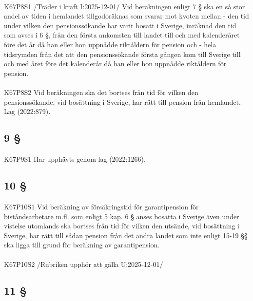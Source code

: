 \documentclass[a4paper,notitlepage,openany,10pt]{book}
\begin{document}
\paragraph*{}
{\tiny K67P8S1}
/Träder i kraft I:2025-12-01/
Vid beräkningen enligt 7 § ska en så stor andel av tiden i hemlandet tillgodoräknas som svarar mot kvoten mellan
\newline - den tid under vilken den pensionssökande har varit bosatt i Sverige, inräknad den tid som avses i 6 §, från den första ankomsten till landet till och med kalenderåret före det år då han eller hon uppnådde riktåldern för pension och
\newline - hela tidsrymden från det att den pensionssökande första gången kom till Sverige till och med året före det kalenderår då han eller hon uppnådde riktåldern för pension.
\paragraph*{}
{\tiny K67P8S2}
Vid beräkningen ska det bortses från tid för vilken den pensionssökande, vid bosättning i Sverige, har rätt till pension från hemlandet.
Lag (2022:879).
\subsection*{9 §}
\paragraph*{}
{\tiny K67P9S1}
Har upphävts genom
lag (2022:1266).
\subsection*{10 §}
\paragraph*{}
{\tiny K67P10S1}
Vid beräkning av försäkringstid för garantipension för biståndsarbetare m.fl. som enligt 5 kap. 6 § anses bosatta i Sverige även under vistelse utomlands ska bortses från tid för vilken den utsände, vid bosättning i Sverige, har rätt till sådan pension från det andra landet som inte enligt 15-19 §§ ska ligga till grund för beräkning av garantipension.
\paragraph*{}
{\tiny K67P10S2}
/Rubriken upphör att gälla U:2025-12-01/
\subsection*{11 §}
\end{document}
